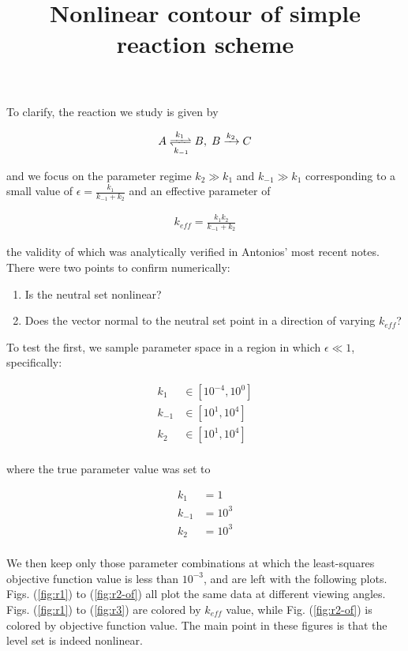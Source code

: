 \documentclass[11pt]{article}
\title{Nonlinear contour of simple reaction scheme}
\begin{document}
\maketitle

To clarify, the reaction we study is given by

\begin{align*}
  A \xrightleftharpoons[k_{-1}]{k_1} B, \; B \xrightarrow[]{k_2} C
\end{align*}

and we focus on the parameter regime $k_2 \gg k_1$ and $k_{-1} \gg
k_1$ corresponding to a small value of $\epsilon = \frac{k_1}{k_{-1} +
  k_2}$ and an effective parameter of

\begin{align*}
  k_{eff} = \frac{k_1 k_2}{k_{-1} + k_2}
\end{align*}

the validity of which was analytically verified in Antonios' most
recent notes. \\

There were two points to confirm numerically: 

\begin{enumerate}
\item Is the neutral set nonlinear?
\item Does the vector normal to the neutral set point in a direction
  of varying $k_{eff}$?
\end{enumerate}

To test the first, we sample parameter space in a region in which
$\epsilon \ll 1$, specifically:

\begin{align*}
  k_1 &\in [10^{-4}, 10^0] \\
  k_{-1} &\in [10^1, 10^4] \\
  k_2 &\in [10^1, 10^4] \\
\end{align*}

where the true parameter value was set to

\begin{align*}
  k_1 &= 1 \\
  k_{-1} &= 10^3 \\
  k_2 &= 10^3 \\
\end{align*}

We then keep only those parameter combinations at which the
least-squares objective function value is less than $10^{-3}$, and are
left with the following plots. Figs. (\ref{fig:r1}) to
(\ref{fig:r2-of}) all plot the same data at different viewing
angles. Figs. (\ref{fig:r1}) to (\ref{fig:r3}) are colored by
$k_{eff}$ value, while Fig. (\ref{fig:r2-of}) is colored by objective
function value. The main point in these figures is that
the level set is indeed nonlinear. \\
\end{document}
